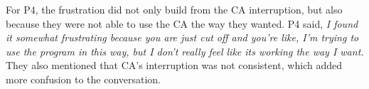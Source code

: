             For P4, the frustration did not only build from the \ac{CA} interruption, but also because they were not able to use the \ac{CA} the way they wanted. P4 said,
                \textit{
                I found it somewhat frustrating because you are just cut off and you're like, I'm trying to use the program in this way, but I don't really feel like its working the way I want.
                }
        They also mentioned that \ac{CA}'s interruption was not consistent, which added more confusion to the conversation.
